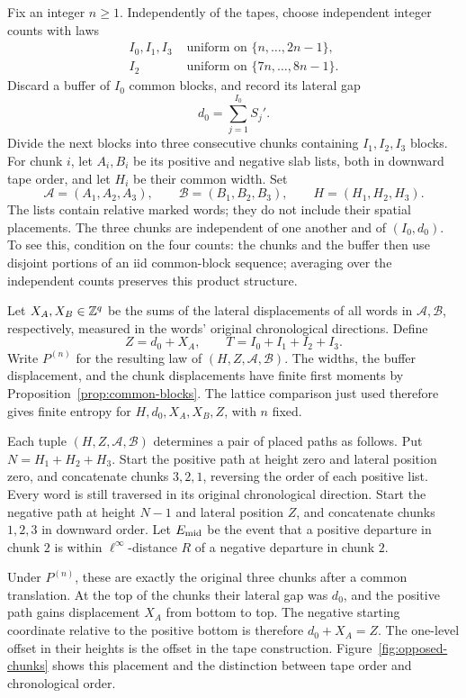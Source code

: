 Fix an integer \(n\ge1\).  Independently of the tapes, choose independent
integer counts with laws
\begin{equation}
 \begin{split}
 I_0,I_1,I_3&\text{ uniform on }\{n,\ldots,2n-1\},\\
 I_2&\text{ uniform on }\{7n,\ldots,8n-1\}.
 \end{split}
 \label{eq:chunk-counts}
\end{equation}
Discard a buffer of \(I_0\) common blocks, and record its lateral gap
\[
 d_0=\sum_{j=1}^{I_0}S_j'.
\]
Divide the next blocks into three consecutive chunks containing
\(I_1,I_2,I_3\) blocks.  For chunk \(i\), let \(A_i,B_i\) be its positive
and negative slab lists, both in downward tape order, and let \(H_i\) be
their common width.  Set
\[
 \mathcal A=(A_1,A_2,A_3),\qquad
 \mathcal B=(B_1,B_2,B_3),\qquad H=(H_1,H_2,H_3).
\]
The lists contain relative marked words; they do not include their spatial
placements.  The three chunks are independent of one another and of
\((I_0,d_0)\).  To see this, condition on the four counts: the chunks and
the buffer then use disjoint portions of an iid common-block sequence;
averaging over the independent counts preserves this product structure.

Let \(X_A,X_B\in\mathbb Z^q\) be the sums of the lateral displacements of all
words in \(\mathcal A,\mathcal B\), respectively, measured in the words'
original chronological directions.  Define
\[
 Z=d_0+X_A,\qquad T=I_0+I_1+I_2+I_3.
\]
Write \(P^{(n)}\) for the resulting law of
\((H,Z,\mathcal A,\mathcal B)\).  The widths, the buffer displacement,
and the chunk displacements have finite first moments by
Proposition~\ref{prop:common-blocks}.  The lattice comparison just used
therefore gives finite entropy for
\(H,d_0,X_A,X_B,Z\), with \(n\) fixed.

Each tuple \((H,Z,\mathcal A,\mathcal B)\) determines a pair of placed
paths as follows.  Put \(N=H_1+H_2+H_3\).  Start the positive path at
height zero and lateral position zero, and concatenate chunks \(3,2,1\),
reversing the order of each positive list.  Every word is still traversed
in its original chronological direction.  Start the negative path at
height \(N-1\) and lateral position \(Z\), and concatenate chunks
\(1,2,3\) in downward order.  Let \(E_{\rm mid}\) be the event that a
positive departure in chunk \(2\) is within \(\ell^\infty\)-distance
\(R\) of a negative departure in chunk \(2\).

Under \(P^{(n)}\), these are exactly the original three chunks after a
common translation.  At the top of the chunks their lateral gap was
\(d_0\), and the positive path gains displacement \(X_A\) from bottom to
top.  The negative starting coordinate relative to the positive bottom is
therefore \(d_0+X_A=Z\).  The one-level offset in their heights is the
offset in the tape construction.  Figure~\ref{fig:opposed-chunks} shows
this placement and the distinction between tape order and chronological
order.

